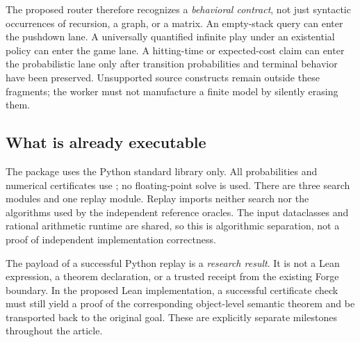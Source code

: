 The proposed router therefore recognizes a \emph{behavioral contract}, not just
syntactic occurrences of recursion, a graph, or a matrix. An empty-stack query
can enter the pushdown lane. A universally quantified infinite play under an
existential policy can enter the game lane. A hitting-time or expected-cost
claim can enter the probabilistic lane only after transition probabilities and
terminal behavior have been preserved. Unsupported source constructs remain
outside these fragments; the worker must not manufacture a finite model by
silently erasing them.

\subsection{What is already executable}
The package uses the Python standard library only. All probabilities and
numerical certificates use ; no floating-point solve
is used. There are three search modules and one replay module. Replay imports
neither search nor the algorithms used by the independent reference oracles.
The input dataclasses and rational arithmetic runtime are shared, so this is
algorithmic separation, not a proof of independent implementation correctness.

The payload of a successful Python replay is a \emph{research result}. It is
not a Lean expression, a theorem declaration, or a trusted receipt from the
existing Forge boundary. In the proposed Lean implementation, a successful
certificate check must still yield a proof of the corresponding object-level
semantic theorem and be transported back to the original goal. These are
explicitly separate milestones throughout the article.
